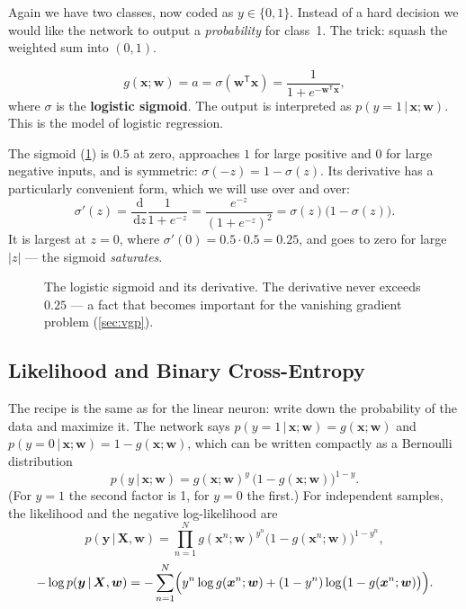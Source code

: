 \documentclass[11pt, oneside]{book}
\newcommand{\Prob}{\mathbb{P}}           %
\newcommand{\dd}{\,\mathrm{d}}
\newcommand{\T}{^{\mathsf{T}}}           %
\newcommand{\given}{\,\vert\,}           %
\newcommand{\bx}{\bm{x}}        \newcommand{\by}{\bm{y}}
\newcommand{\bw}{\bm{w}}        \newcommand{\bW}{\bm{W}}
\newcommand{\bX}{\bm{X}}        \newcommand{\bY}{\bm{Y}}
\let\originalsubsection\subsection
\renewcommand{\subsection}{\Needspace{6\baselineskip}\originalsubsection}
\begin{document}
Again we have two classes, now coded as $y \in \{0, 1\}$. Instead of a hard
decision we would like the network to output a \emph{probability} for
class~1. The trick: squash the weighted sum into $(0,1)$.

\begin{defbox}[title={Logistic neuron (logistic regression)}]
\[
  g(\bx; \bw) = a = \sigma(\bw\T\bx) = \frac{1}{1 + e^{-\bw\T\bx}},
\]
where $\sigma$ is the \textbf{logistic sigmoid}. The output is interpreted as
$p(y = 1 \given \bx; \bw)$. This is the model of logistic regression.
\end{defbox}

The sigmoid (\cref{fig:sigmoid}) is $0.5$ at zero, approaches $1$ for large
positive and $0$ for large negative inputs, and is symmetric:
$\sigma(-z) = 1 - \sigma(z)$. Its derivative has a particularly convenient
form, which we will use over and over:
\[
  \sigma'(z) = \frac{\dd}{\dd z}\frac{1}{1 + e^{-z}}
  = \frac{e^{-z}}{(1+e^{-z})^2} = \sigma(z)\bigl(1 - \sigma(z)\bigr).
\]
It is largest at $z = 0$, where $\sigma'(0) = 0.5 \cdot 0.5 = 0.25$, and
goes to zero for large $|z|$ --- the sigmoid \emph{saturates}.

\begin{figure}[htbp]
\centering
{}
\caption{The logistic sigmoid and its derivative. The derivative never
exceeds $0.25$ --- a fact that becomes important for the vanishing gradient
problem (\cref{sec:vgp}).}
\label{fig:sigmoid}
\end{figure}

\subsection{Likelihood and Binary Cross-Entropy}

The recipe is the same as for the linear neuron: write down the probability
of the data and maximize it. The network says
$p(y = 1 \given \bx; \bw) = g(\bx;\bw)$ and $p(y = 0 \given \bx; \bw) = 1 -
g(\bx;\bw)$, which can be written compactly as a Bernoulli distribution
\[
  p(y \given \bx; \bw) = g(\bx;\bw)^{y}\,\bigl(1 - g(\bx;\bw)\bigr)^{1-y}.
\]
(For $y = 1$ the second factor is 1, for $y = 0$ the first.) For independent
samples, the likelihood and the negative log-likelihood are
\[
  p(\by \given \bX, \bw) = \prod_{n=1}^{N} g(\bx^n;\bw)^{y^n}\bigl(1 - g(\bx^n;\bw)\bigr)^{1-y^n},
\]
\[
  -\log p(\by \given \bX, \bw)
  = -\sum_{n=1}^{N} \Bigl( y^n \log g(\bx^n;\bw) + (1 - y^n)\log\bigl(1 - g(\bx^n;\bw)\bigr) \Bigr).
\]
\end{document}
